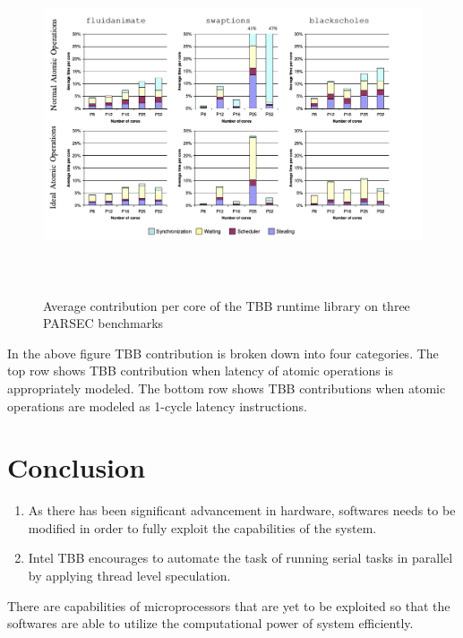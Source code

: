 \documentclass[a4paper,12pt]{article}
\begin{document}
\begin{figure}[H]
  \includegraphics[width=\textwidth,height=10cm]{diag.png}
  \caption{Average contribution per core of the TBB runtime library on three PARSEC benchmarks }
  \label{fig:inteltbb}
\end{figure}

In the above figure TBB contribution is broken down into four categories. The top row shows TBB contribution when latency of atomic operations is appropriately modeled. The bottom row shows TBB contributions when atomic operations are modeled as 1-cycle latency instructions.\cite{inteltbb}

\section{Conclusion}
\begin{enumerate}
\item As there has been significant advancement in hardware, softwares needs to be modified in order to fully exploit the capabilities of the system.
\item Intel TBB encourages to automate the task of running serial tasks in parallel by applying thread level speculation.
\end{enumerate}
There are capabilities of microprocessors that are yet to be exploited so that the softwares are able to utilize the computational power of system efficiently.
\printbibliography[heading=bibintoc]
\end{document}
